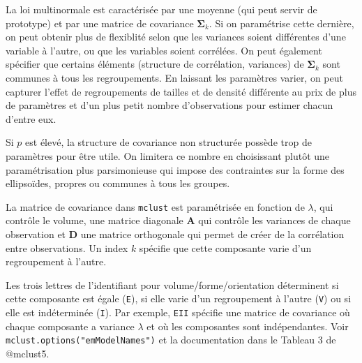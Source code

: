 \documentclass[
  11pt,
  letterpaper,
]{scrbook}
\theoremstyle{definition}
\theoremstyle{remark}
\begin{document}
La loi multinormale est caractérisée par une moyenne (qui peut servir de
prototype) et par une matrice de covariance \(\boldsymbol{\Sigma}_k\).
Si on paramétrise cette dernière, on peut obtenir plus de flexiblité
selon que les variances soient différentes d'une variable à l'autre, ou
que les variables soient corrélées. On peut également spécifier que
certains éléments (structure de corrélation, variances) de
\(\boldsymbol{\Sigma}_k\) sont communes à tous les regroupements. En
laissant les paramètres varier, on peut capturer l'effet de
regroupements de tailles et de densité différente au prix de plus de
paramètres et d'un plus petit nombre d'observations pour estimer chacun
d'entre eux.

Si \(p\) est élevé, la structure de covariance non structurée possède
trop de paramètres pour être utile. On limitera ce nombre en choisissant
plutôt une paramétrisation plus parsimonieuse qui impose des contraintes
sur la forme des ellipsoïdes, propres ou communes à tous les groupes.

La matrice de covariance dans \texttt{mclust} est paramétrisée en
fonction de \(\lambda\), qui contrôle le volume, une matrice diagonale
\(\mathbf{A}\) qui contrôle les variances de chaque observation et
\(\mathbf{D}\) une matrice orthogonale qui permet de créer de la
corrélation entre observations. Un index \(k\) spécifie que cette
composante varie d'un regroupement à l'autre.

Les trois lettres de l'identifiant pour volume/forme/orientation
déterminent si cette composante est égale (\texttt{E}), si elle varie
d'un regroupement à l'autre (\texttt{V}) ou si elle est indéterminée
(\texttt{I}). Par exemple, \texttt{EII} spécifie une matrice de
covariance où chaque composante a variance \(\lambda\) et où les
composantes sont indépendantes. Voir
\texttt{mclust.options("emModelNames")} et la documentation dans le
Tableau 3 de @mclust5.
\end{document}
